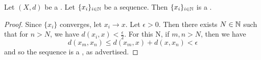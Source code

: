 \begin{prop}
\label{prop:pseudometricconvergenceimpliespseudometriccauchy}

    Let $(X,d)$ be a
    \PseudometricSpace.
    Let $\{x_i\}_{i \in \mathbb{N}}$ be a 
    \PseudometricConvergent sequence. 
    Then $\{x_i\}_{i \in \mathbb{N}}$
    is a \PseudometricCauchySequence.

    \begin{proof}
        Since $\{x_i\}$ converges, let 
        $x_i \to x$. 
        Let $\epsilon > 0$. 
        Then there exists $N \in \mathbb{N}$ 
        such that for $n>N$, we have
        $d(x_i, x) < \frac{\epsilon}{2}$. 
        For this N, if $m,n > N$, then we have 
        \begin{equation}
        d(x_m,x_n) \leq d(x_m,x) + d(x,x_n) < \epsilon
        \end{equation}
        and so the sequence is a
        \PseudometricCauchySequence, as advertised. 
    \end{proof}
\end{prop}
